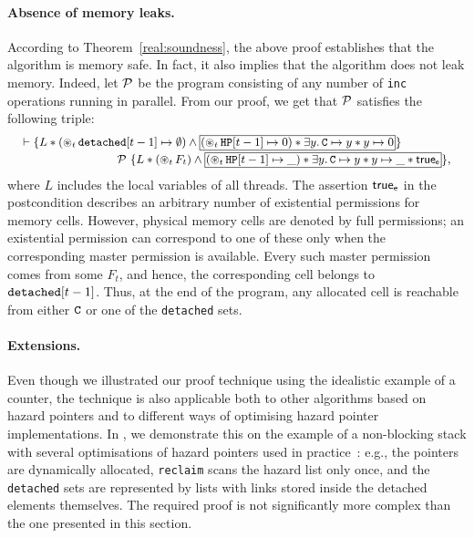 \paragraph{Absence of memory leaks.} According to Theorem~\ref{real:soundness},
the above proof establishes that the algorithm is memory safe. In fact, it also
implies that the algorithm does not leak memory. Indeed, let $\mathcal{P}$ be the
program consisting of any number of {\tt inc} operations running in
parallel. From our proof, we get that $\mathcal{P}$ satisfies the following triple:
$$
\small
\begin{array}{@{}l@{}}
\vdash
\{L * (\bigast\nolimits_{t} \rlist[t-1] \mapsto \emptyset) 
\wedge{}
\shareds{(\bigast\nolimits_{t}\HP[t-1] \mapsto 0) * 
\exists y.\, \cc \mapsto y * y \mapsto 0 }\}
\\[2pt]
\qquad\qquad\qquad\qquad\cp\
\{L * (\bigast\nolimits_{t} F_t) \wedge
\shareds{(\bigast\nolimits_{t} \HP[t-1] \mapsto \_) * \exists y.\,
  \cc \mapsto y * y \mapsto \_ * \true_\se}\},
\end{array}
$$
where $L$ includes the local variables of all threads. The assertion $\mathsf{true}_{\sf e}$
in the postcondition describes an arbitrary number of existential permissions
for memory cells. However, physical memory cells are denoted by full
permissions; an existential permission can correspond to one of these only when
the corresponding master permission is available. Every such master permission
comes from some $F_t$, and hence, the corresponding cell belongs to ${\tt
  detached}[t-1]$. Thus, at the end of the program, any allocated cell is
reachable from either $\texttt{C}$ or one of the {\tt detached} sets.

\paragraph{Extensions.} 
Even though we illustrated our proof technique using the idealistic example of a
counter, the technique is also applicable both to other algorithms based on
hazard pointers and to different ways of optimising hazard pointer
implementations. In \tr{\ref{sec:ProofsHazard}}{\nhazard}, we demonstrate this
on the example of a non-blocking stack with several optimisations of hazard
pointers used in practice~\cite{hazard}: e.g., the pointers are dynamically
allocated, \texttt{reclaim} scans the hazard list only once, and the {\tt
  detached} sets are represented by lists with links stored inside the detached
elements themselves. The required proof is not significantly more complex than
the one presented in this section.

